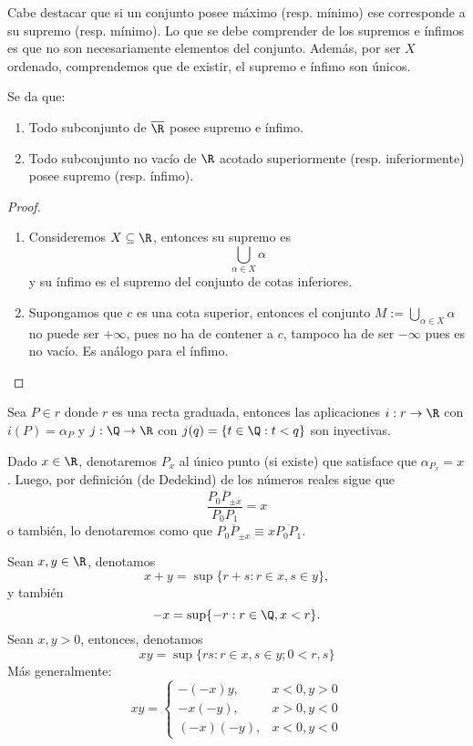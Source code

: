 \documentclass[11pt,a4paper]{book}
\begin{document}
Cabe destacar que si un conjunto posee máximo (resp. mínimo) ese corresponde a su supremo (resp. mínimo). Lo que se debe comprender de los supremos e ínfimos es que no son necesariamente elementos del conjunto. Además, por ser $X$ ordenado, comprendemos que de existir, el supremo e ínfimo son únicos.
\begin{thm}
Se da que:
\begin{enumerate}
\item Todo subconjunto de $\overline{\R}$ posee supremo e ínfimo.
\item Todo subconjunto no vacío de $\R$ acotado superiormente (resp. inferiormente) posee supremo (resp. ínfimo).
\end{enumerate}
\end{thm}
\begin{proof}
\begin{enumerate}
\item Consideremos $X\subseteq\R$, entonces su supremo es
$$\bigcup_{\alpha\in X}\alpha$$
y su ínfimo es el supremo del conjunto de cotas inferiores.
\item Supongamos que $c$ es una cota superior, entonces el conjunto $M:=\bigcup_{\alpha\in X}\alpha$ no puede ser $+\infty$, pues no ha de contener a $c$, tampoco ha de ser $-\infty$ pues es no vacío. Es análogo para el ínfimo.
\end{enumerate}
\end{proof}
\begin{prop}\label{thm:rational-inclusion-reals}
Sea $P\in r$ donde $r$ es una recta graduada, entonces las aplicaciones $i:r\rightarrow\R$ con $i(P)=\alpha_P$ y $j:\Q\rightarrow\R$ con $j(q)=\{t\in\Q:t<q\}$ son inyectivas.
\end{prop}
\begin{mydef}
Dado $x\in\R$, denotaremos $P_x$ al único punto (si existe) que satisface que $\alpha_{P_x}=x$. Luego, por definición (de Dedekind) de los números reales sigue que
$$\frac{\overline{P_0P_{\pm x}}}{P_0P_1}=x$$
o también, lo denotaremos como que $\overline{P_0P_{\pm x}}\equiv x\overline{P_0P_1}$.
\end{mydef}
\begin{mydef}[Operaciones en $\R$]
Sean $x,y\in\R$, denotamos
	$$x+y=\sup\{r+s:r\in x,s\in y\},$$
y también
	$$-x=\sup\{-r:r\in\Q,x<r\}.$$
Sean $x,y>0$, entonces, denotamos
	$$xy=\sup\{rs:r\in x,s\in y;0<r,s\}$$
Más generalmente:
	$$xy=\begin{cases}
	-(-x)y, &x<0,y>0\\
	-x(-y), &x>0,y<0\\
	(-x)(-y), &x<0,y<0
	\end{cases}$$
\end{mydef}
\end{document}
